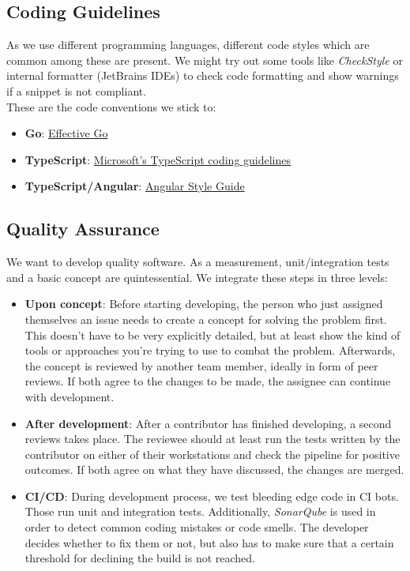 \documentclass[a4paper,12pt,chapterprefix=false,bibliography=totoc,listof=totoc,]{scrreprt}
\begin{document}
\subsection{Coding Guidelines}
As we use different programming languages, different code styles which are common among these are present. We might try out some tools like \emph{CheckStyle} or internal formatter (JetBrains IDEs) to check code formatting and show warnings if a snippet is not compliant. \\

These are the code conventions we stick to:
\begin{itemize}
	\item \textbf{Go}: \href{https://golang.org/doc/effective_go.html}{Effective Go}
	\item \textbf{TypeScript}: \href{https://github.com/microsoft/TypeScript/wiki/Coding-guidelines}{Microsoft's TypeScript coding guidelines}
	\item \textbf{TypeScript/Angular}: \href{https://angular.io/guide/styleguide}{Angular Style Guide}
\end{itemize}

\subsection{Quality Assurance}
\label{sec:support_qa}
We want to develop quality software. As a measurement, unit/integration tests and a basic concept are quintessential. We integrate these steps in three levels:
\begin{itemize}
	\item \textbf{Upon concept}: Before starting developing, the person who just assigned themselves an issue needs to create a concept for solving the problem first. This doesn't have to be very explicitly detailed, but at least show the kind of tools or approaches you're trying to use to combat the problem. Afterwards, the concept is reviewed by another team member, ideally in form of peer reviews. If both agree to the changes to be made, the assignee can continue with development.
	\item \textbf{After development}: After a contributor has finished developing, a second reviews takes place. The reviewee should at least run the tests written by the contributor on either of their workstations and check the pipeline for positive outcomes. If both agree on what they have discussed, the changes are merged.
	\item \textbf{CI/CD}: During development process, we test bleeding edge code in CI bots. Those run unit and integration tests. Additionally, \emph{SonarQube} is used in order to detect common coding mistakes or code smells. The developer decides whether to fix them or not, but also has to make sure that a certain threshold for declining the build is not reached.
\end{itemize}
\end{document}
